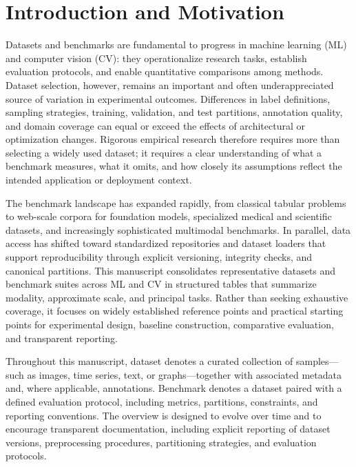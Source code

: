 \documentclass{article}
\begin{document}
\clearpage




\renewcommand{\contentsname}{Table of Contents}

\tableofcontents




\clearpage




\section{Introduction and Motivation}

Datasets and benchmarks are fundamental to progress in machine learning (ML) and computer vision (CV): they operationalize research tasks, establish evaluation protocols, and enable quantitative comparisons among methods. Dataset selection, however, remains an important and often underappreciated source of variation in experimental outcomes. Differences in label definitions, sampling strategies, training, validation, and test partitions, annotation quality, and domain coverage can equal or exceed the effects of architectural or optimization changes. Rigorous empirical research therefore requires more than selecting a widely used dataset; it requires a clear understanding of what a benchmark measures, what it omits, and how closely its assumptions reflect the intended application or deployment context.

The benchmark landscape has expanded rapidly, from classical tabular problems to web-scale corpora for foundation models, specialized medical and scientific datasets, and increasingly sophisticated multimodal benchmarks. In parallel, data access has shifted toward standardized repositories and dataset loaders that support reproducibility through explicit versioning, integrity checks, and canonical partitions. This manuscript consolidates representative datasets and benchmark suites across ML and CV in structured tables that summarize modality, approximate scale, and principal tasks. Rather than seeking exhaustive coverage, it focuses on widely established reference points and practical starting points for experimental design, baseline construction, comparative evaluation, and transparent reporting.

Throughout this manuscript, dataset denotes a curated collection of samples---such as images, time series, text, or graphs---together with associated metadata and, where applicable, annotations. Benchmark denotes a dataset paired with a defined evaluation protocol, including metrics, partitions, constraints, and reporting conventions. The overview is designed to evolve over time and to encourage transparent documentation, including explicit reporting of dataset versions, preprocessing procedures, partitioning strategies, and evaluation protocols.
\end{document}
